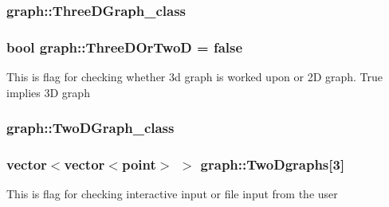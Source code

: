 \subsubsection[{\texorpdfstring{Three\+D\+Graph\+\_\+class}{ThreeDGraph_class}}]{\setlength{\rightskip}{0pt plus 5cm}graph\+::\+Three\+D\+Graph\+\_\+class}\hypertarget{namespacegraph_a6d6720407138e1b7385150ec904289ed}{}\label{namespacegraph_a6d6720407138e1b7385150ec904289ed}
\subsubsection[{\texorpdfstring{Three\+D\+Or\+TwoD}{ThreeDOrTwoD}}]{\setlength{\rightskip}{0pt plus 5cm}bool graph\+::\+Three\+D\+Or\+TwoD = false}\hypertarget{namespacegraph_aaa8a7bf9ccfc70dd98f403db09e1d57f}{}\label{namespacegraph_aaa8a7bf9ccfc70dd98f403db09e1d57f}
This is flag for checking whether 3d graph is worked upon or 2D graph. True implies 3D graph 
\subsubsection[{\texorpdfstring{Two\+D\+Graph\+\_\+class}{TwoDGraph_class}}]{\setlength{\rightskip}{0pt plus 5cm}graph\+::\+Two\+D\+Graph\+\_\+class}\hypertarget{namespacegraph_ac1ee141f058e6cf5c5a0cd0b19461b96}{}\label{namespacegraph_ac1ee141f058e6cf5c5a0cd0b19461b96}
\subsubsection[{\texorpdfstring{Two\+Dgraphs}{TwoDgraphs}}]{\setlength{\rightskip}{0pt plus 5cm}vector$<$vector$<${\bf point}$>$ $>$ graph\+::\+Two\+Dgraphs\mbox{[}3\mbox{]}}\hypertarget{namespacegraph_ac3d5fa2626975ad4c78b6eb5b1dac82f}{}\label{namespacegraph_ac3d5fa2626975ad4c78b6eb5b1dac82f}
This is flag for checking interactive input or file input from the user 